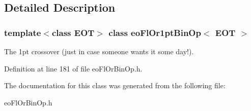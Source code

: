 \subsection{Detailed Description}
\subsubsection*{template$<$class EOT$>$ class eo\-Fl\-Or1pt\-Bin\-Op$<$ EOT $>$}

The 1pt crossover (just in case someone wants it some day!). 



Definition at line 181 of file eo\-Fl\-Or\-Bin\-Op.h.

The documentation for this class was generated from the following file:\begin{CompactItemize}
\item 
eo\-Fl\-Or\-Bin\-Op.h\end{CompactItemize}
